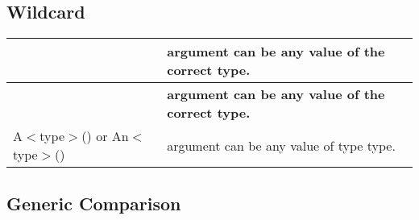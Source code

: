 \subsection*{Wildcard}

\tabulinesep=1mm
\begin{longtabu} spread 0pt [c]{*2{|X[-1]}|}
\hline
\rowcolor{\tableheadbgcolor}{\bf {\ttfamily \+\_\+}}&{\bf {\ttfamily argument} can be any value of the correct type.  }\\
\endfirsthead
\hline
\endfoot
\hline
\rowcolor{\tableheadbgcolor}{\bf {\ttfamily \+\_\+}}&{\bf {\ttfamily argument} can be any value of the correct type.  }\\
\endhead
{\ttfamily A$<$type$>$()} or {\ttfamily An$<$type$>$()}&{\ttfamily argument} can be any value of type {\ttfamily type}. \\
\end{longtabu}
\subsection*{Generic Comparison}

